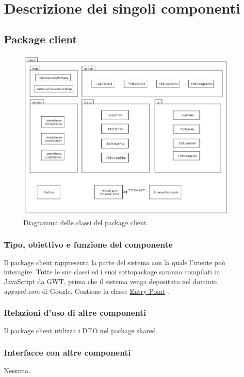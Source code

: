 \chapter{Descrizione dei singoli componenti}
\section{Package client}
\begin{figure}[h]
  \centering
  \includegraphics[width=16cm]{img/ST/ClassClient.png}
\caption{Diagramma delle classi del package client.}
\end{figure}

\newpage
\subsection*{Tipo, obiettivo e funzione del componente} %
Il package client rappresenta la parte del sistema con la quale l'utente pu\`o
interagire. Tutte le sue classi ed i suoi sottopackage saranno compilati in
JavaScript da GWT, prima che il sistema venga depositato nel dominio
\emph{appspot.com} di Google. Contiene la classe \underline{Entry Point}
.

\subsection*{Relazioni d'uso di altre componenti}
Il package client utilizza i DTO nel package shared.

\subsection*{Interfacce con altre componenti}
Nessuna.

